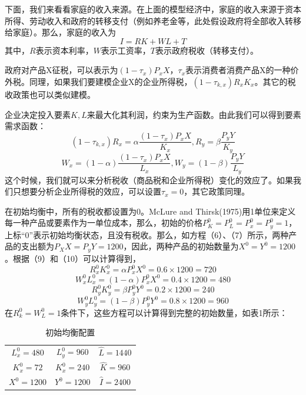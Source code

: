 \documentclass[cn,12pt,math=newtx,citestyle=gb7714-2015,bibstyle=gb7714-2015]{elegantbook}
\begin{document}
	下面，我们来看看家庭的收入来源。在上面的模型经济中，家庭的收入来源于资本所得、劳动收入和政府的转移支付（例如养老金等，此处假设政府将全部收入转移给家庭）。那么，家庭的收入为
	\begin{equation}
		I=RK+WL+T
	\end{equation}
	其中，$R$表示资本利率，$W$表示工资率，$T$表示政府税收（转移支付）。
	
	政府对产品X征税，可以表示为$(1-\tau_x)P_xX$，$\tau_x$表示消费者消费产品X的一种价外税。同理，如果我们要建模企业X的企业所得税，$(1-\tau_{k,x})R_xK_x$。其它的税收政策也可以类似建模。
	
	企业决定投入要素$K,L$来最大化其利润，约束为生产函数。由此我们可以得到要素需求函数：
	\begin{equation}
		(1-\tau_{k,x})R_x=\alpha \frac{(1-\tau_x)P_xX}{K_x},R_y=\beta \frac{P_yY}{K_y}
	\end{equation}
	\begin{equation}
		W_x=(1-\alpha) \frac{(1-\tau_x)P_xX}{L_x},W_y=(1-\beta) \frac{P_yY}{L_y}
	\end{equation}
	这个时候，我们就可以来分析税收（商品税和企业所得税）变化的效应了。如果我们只想要分析企业所得税的效应，可以设置$\tau_x=0$，其它政策同理。
	
	在初始均衡中，所有的税收都设置为0。McLure and Thirsk(1975)用1单位来定义每一种产品或要素作为一单位成本，那么，初始的价格$P_K^0=P_L^0=P_x^0=P_y^0=1$，上标“0”表示初始均衡状态，且没有税收。那么，如方程（6）、（7）所示，两种产品的支出额为$P_XX=P_yY=1200$，因此，两种产品的初始数量为$X^0=Y^0=1200$。根据（9）和（10）可以计算得到，
	\begin{equation}
		R_x^0K_x^0=\alpha P_x^0X^0=0.6 \times 1200=720
	\end{equation}
	\begin{equation}
		W_x^0L_x^0=(1-\alpha) P_x^0X^0=0.4 \times 1200=480
	\end{equation}
	\begin{equation}
		R_y^0K_y^0=\beta P_y^0Y^0=0.2 \times 1200=240
	\end{equation}
	\begin{equation}
		W_y^0L_y^0=(1-\beta) P_y^0Y^0=0.8 \times 1200=960
	\end{equation}
	在$R_k^0=W_L^0=1$条件下，这些方程可以计算得到完整的初始数量，如表1所示：
	
	\begin{table}[!htbp]
		\centering
		\caption{初始均衡配置}
		\begin{tabular}{ccc}
			\hline
			$L^0_x=480$& $L^0_y=960$ & $\hat{L}=1440$ \\
			$K^0_x=72$& $K^0_x=240$ &$\hat{K}=960$  \\
			$X^0=1200$& $Y^0=1200$ & $\hat{I}=2400$ \\
			\hline
		\end{tabular}
	\end{table}
	
\end{document}
